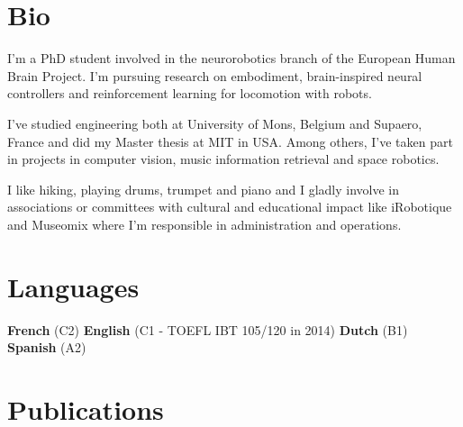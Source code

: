 \documentclass[a4paper]{deedy-resume} %
\begin{document}
\hfill
\begin{minipage}[b]{0.33\linewidth}
	
	\section{Bio}
	\vspace{5pt}
	I'm a PhD student involved in the neurorobotics branch of the European Human Brain Project. I'm pursuing research on embodiment, brain-inspired neural controllers and reinforcement learning for locomotion with robots.
	
	I've studied engineering both at University of Mons, Belgium and Supaero, France and did my Master thesis at MIT in USA. Among others, I've taken part in projects in computer vision, music information retrieval and space robotics.
	
	I like hiking, playing drums, trumpet and piano and I gladly involve in associations or committees with cultural and educational impact like iRobotique and Museomix where I'm responsible in administration and operations.
	
	\vspace{5pt}
	
	
	\section{Languages}
	\vspace{5pt}
	\textbf{French} (C2)   \textbullet{}  \textbf{English} (C1 - TOEFL IBT 105/120 in 2014)   \textbullet{}   \textbf{Dutch} (B1)   \textbullet{}\\   \textbf{Spanish} (A2)
	\vspace{10pt}
	
\end{minipage}

\vspace{5pt}


\section{Publications}
\end{document}
